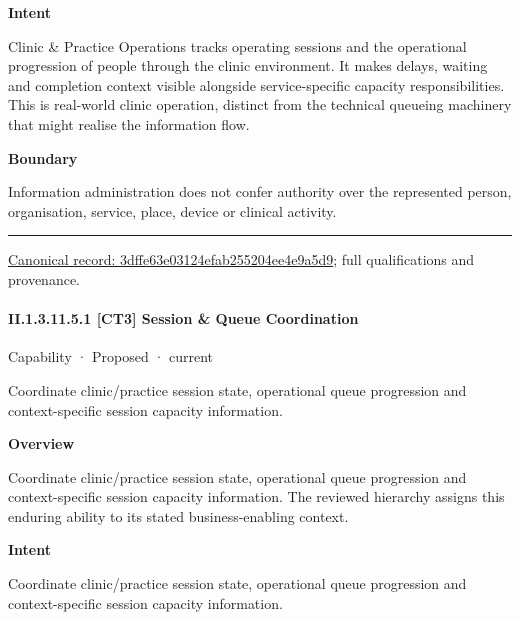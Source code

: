 \textbf{Intent}



Clinic \& Practice Operations tracks operating sessions and the operational progression of people through the clinic environment. It makes delays, waiting and completion context visible alongside service-specific capacity responsibilities. This is real-world clinic operation, distinct from the technical queueing machinery that might realise the information flow.



\textbf{Boundary}



Information administration does not confer authority over the represented person, organisation, service, place, device or clinical activity.



\medskip\hrule\medskip

{\footnotesize \href{../../../../continuum/strategy/capability/3dffe63e03124efab255204ee4e9a5d9.md}{Canonical record: 3dffe63e03124efab255204ee4e9a5d9}; full qualifications and provenance.}\par
\paragraph*{II.1.3.11.5.1 [CT3] Session \& Queue Coordination}
\label{navigation:II.1.3.11.5.1}

\label{element:22981a95ca6e466582363706fde8fceb}
{\small Capability · Proposed · current}\par

Coordinate clinic/practice session state, operational queue progression and context-specific session capacity information.



\textbf{Overview}



Coordinate clinic/practice session state, operational queue progression and context-specific session capacity information. The reviewed hierarchy assigns this enduring ability to its stated business-enabling context.



\textbf{Intent}



Coordinate clinic/practice session state, operational queue progression and context-specific session capacity information.



